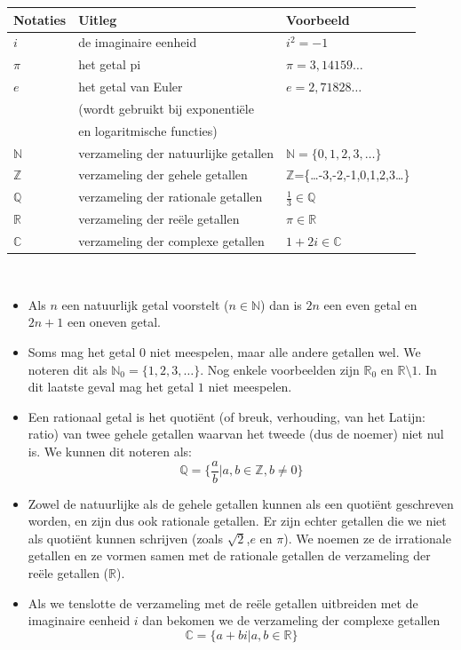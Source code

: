 \begin{center}
	\begin{tabular}{lll}
		Notaties & Uitleg & Voorbeeld \\
		\hline
		$i$ & de imaginaire eenheid & $i^2=-1$ \\
		$\pi$ & het getal pi & $\pi=3,14159\ldots$ \\
		$e$ & het getal van Euler & $e=2,71828\ldots$\\
		& (wordt gebruikt bij exponenti\"ele & \\
		&  en logaritmische functies) & \\
		$\mathbb{N}$ & verzameling der natuurlijke getallen & $\mathbb{N}=\{0,1,2,3,\ldots\}$ \\
		$\mathbb{Z}$ & verzameling der gehele getallen & $\mathbb{Z}$=\{\ldots-3,-2,-1,0,1,2,3\ldots\}\\
		$\mathbb{Q}$ & verzameling der rationale getallen & $\frac{1}{3}\in \mathbb{Q}$ \\
		$\mathbb{R}$ & verzameling der re\"ele getallen & $\pi \in \mathbb{R}$ \\
		$\mathbb{C}$ & verzameling der complexe getallen & $1+2i \in \mathbb{C}$
	\end{tabular}
\end{center}

\begin{opmerking}
	\ \\	
\begin{itemize}
	\item Als $n$ een natuurlijk getal voorstelt ($n \in \mathbb{N}$) dan is $2n$ een even getal en $2n+1$ een oneven getal.
	\item Soms mag het getal $0$ niet meespelen, maar alle andere getallen wel.  We noteren dit als  $\mathbb{N}_0=\{1,2,3,\ldots\}$. Nog enkele voorbeelden zijn $\mathbb{R}_0$ en $\mathbb{R} \setminus {1}$.  In dit laatste geval mag het getal $1$ niet meespelen.
	\item Een rationaal getal is het quoti\"ent (of breuk, verhouding, van het Latijn: ratio) van twee gehele getallen waarvan het tweede (dus de noemer) niet nul is.  We kunnen dit noteren als:
	\begin{equation*}
	\mathbb{Q}=\{\frac{a}{b}|a,b\in \mathbb{Z}, b \ne 0\}
	\end{equation*}
	\item Zowel de natuurlijke als de gehele getallen kunnen als een quoti\"ent geschreven worden, en zijn dus ook rationale getallen.  Er zijn echter getallen die we niet als quoti\"ent kunnen schrijven (zoals $\sqrt{2}$,$e$ en $\pi$). We noemen ze de irrationale getallen en ze vormen samen met de rationale getallen de verzameling der re\"ele getallen ($\mathbb{R}$).
	\item Als we tenslotte de verzameling met de re\"ele getallen uitbreiden met de imaginaire eenheid $i$ dan bekomen we de verzameling der complexe getallen
	\begin{equation*}
	\mathbb{C} = \{a+bi|a,b \in \mathbb{R}\}
	\end{equation*}
\end{itemize}
\end{opmerking}

